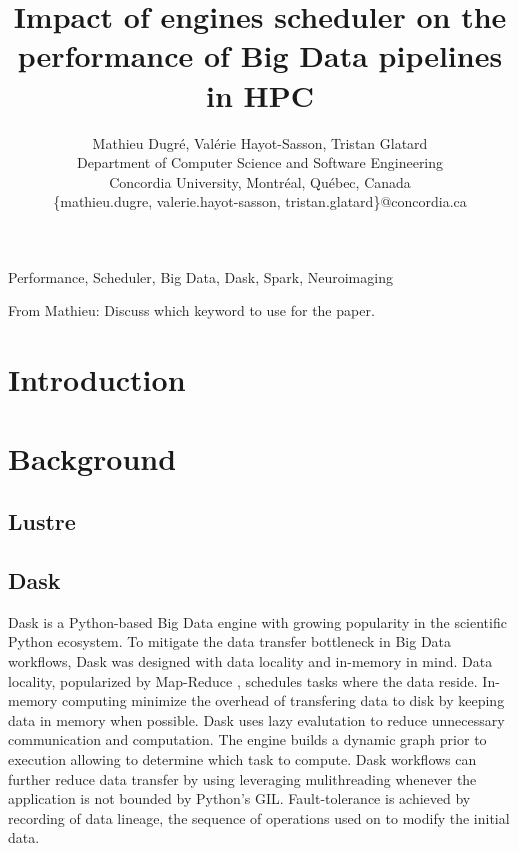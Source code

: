\documentclass[conference]{IEEEtran}
\newcommand{\MD}[1]{\color{magenta}From Mathieu: #1 \color{black}}
\begin{document}
\title{Impact of engines scheduler on the performance of Big Data pipelines in HPC}

\author{Mathieu Dugr\'e, Val\'erie Hayot-Sasson, Tristan Glatard\\
	Department of Computer Science and Software Engineering\\
	Concordia University, Montr\'eal, Qu\'ebec, Canada\\
	\{mathieu.dugre, valerie.hayot-sasson, tristan.glatard\}@concordia.ca
	\vspace*{0.8cm} %
}

\maketitle

\begin{abstract}
\end{abstract}

\begin{IEEEkeywords}
	Performance, Scheduler, Big Data, Dask, Spark, Neuroimaging
\end{IEEEkeywords}
\MD{Discuss which keyword to use for the paper.}

\section{Introduction}

\section{Background}
\subsection{Lustre} %

\subsection{Dask}
Dask is a Python-based Big Data engine with growing popularity in the scientific Python ecosystem.
To mitigate the data transfer bottleneck in Big Data workflows, Dask was designed with data locality and in-memory in mind.
Data locality, popularized by Map-Reduce \cite{dean2008mapreduce}, schedules tasks where the data reside.
In-memory computing minimize the overhead of transfering data to disk by keeping data in memory when possible.
Dask uses lazy evalutation to reduce unnecessary communication and computation.
The engine builds a dynamic graph prior to execution allowing to determine which task to compute.
Dask workflows can further reduce data transfer by using leveraging mulithreading whenever the application is not bounded by Python's GIL.
Fault-tolerance is achieved by recording of data lineage, the sequence of operations used on to modify the initial data.
\end{document}
